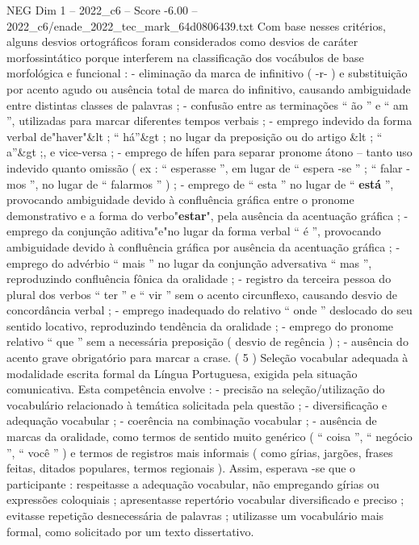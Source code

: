 \begin{textsample}{NEG Dim 1 – 2022\_c6 – Score -6.00 – 2022\_c6/enade\_2022\_tec\_mark\_64d0806439.txt}
Com base nesses critérios, alguns desvios ortográficos foram considerados como desvios de caráter morfossintático porque interferem na classificação dos vocábulos de base morfológica e funcional : - eliminação da marca de infinitivo ( -r- ) e substituição por acento agudo ou ausência total de marca do infinitivo, causando ambiguidade entre distintas classes de palavras ; - confusão entre as terminações “ ão ” e “ am ”, utilizadas para marcar diferentes tempos verbais ; - emprego indevido da forma verbal de"haver"\&lt ; “ há”\&gt ; no lugar da preposição ou do artigo \&lt ; “ a”\&gt ;, e vice-versa ; - emprego de hífen para separar pronome átono – tanto uso indevido quanto omissão ( ex : “ esperasse ”, em lugar de “ espera -se ” ; “ falar -mos ”, no lugar de “ falarmos ” ) ; - emprego de “ esta ” no lugar de “ \textbf{está} ”, provocando ambiguidade devido à confluência gráfica entre o pronome demonstrativo e a forma do verbo"\textbf{estar}", pela ausência da acentuação gráfica ; - emprego da conjunção aditiva"e"no lugar da forma verbal “ é ”, provocando ambiguidade devido à confluência gráfica por ausência da acentuação gráfica ; - emprego do advérbio “ mais ” no lugar da conjunção adversativa “ mas ”, reproduzindo confluência fônica da oralidade ; - registro da terceira pessoa do plural dos verbos “ ter ” e “ vir ” sem o acento circunflexo, causando desvio de concordância verbal ; - emprego inadequado do relativo “ onde ” deslocado do seu sentido locativo, reproduzindo tendência da oralidade ; - emprego do pronome relativo “ que ” sem a necessária preposição ( desvio de regência ) ; - ausência do acento grave obrigatório para marcar a crase. ( 5 ) Seleção vocabular adequada à modalidade escrita formal da Língua Portuguesa, exigida pela situação comunicativa.
Esta competência envolve : - precisão na seleção/utilização do vocabulário relacionado à temática solicitada pela questão ; - diversificação e adequação vocabular ; - coerência na combinação vocabular ; - ausência de marcas da oralidade, como termos de sentido muito genérico ( “ coisa ”, “ negócio ”, “ você ” ) e termos de registros mais informais ( como gírias, jargões, frases feitas, ditados populares, termos regionais ).
Assim, esperava -se que o participante : respeitasse a adequação vocabular, não empregando gírias ou expressões coloquiais ; apresentasse repertório vocabular diversificado e preciso ; evitasse repetição desnecessária de palavras ; utilizasse um vocabulário mais formal, como solicitado por um texto dissertativo.

\end{textsample}
